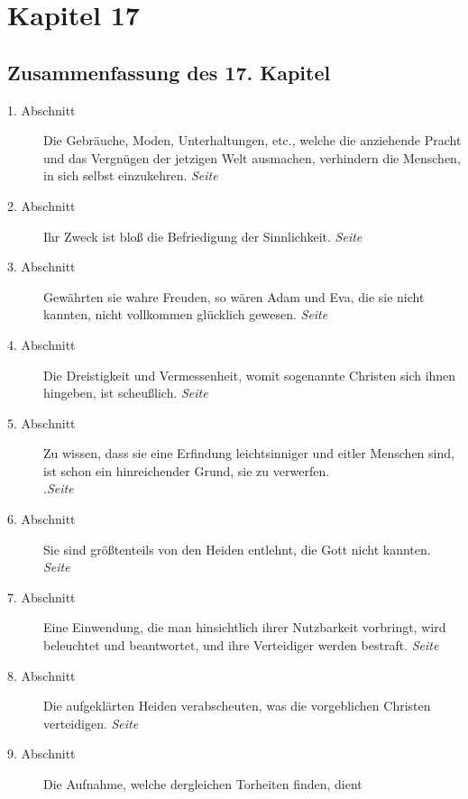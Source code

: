 
\chapter{Kapitel 17} \label{kap17}
\section{Zusammenfassung des 17. Kapitel}

\begin{description}
\item[1. Abschnitt] Die Gebräuche, Moden, Unterhaltungen, etc., welche die
anziehende Pracht und das Vergnügen der jetzigen Welt ausmachen, verhindern die
Menschen, in sich selbst einzukehren.
\dotfill \textit{Seite~\pageref{kap17_ab1}}\\
\item[2. Abschnitt] Ihr Zweck ist bloß die Befriedigung der Sinnlichkeit.
\dotfill \textit{Seite~\pageref{kap17_ab2}}\\
\item[3. Abschnitt] Gewährten sie wahre Freuden, so wären Adam und Eva, die sie
nicht kannten, nicht vollkommen glücklich gewesen.
\dotfill \textit{Seite~\pageref{kap17_ab3}}\\
\item[4. Abschnitt] Die Dreistigkeit und Vermessenheit, womit sogenannte
Christen sich ihnen hingeben, ist scheußlich.
\dotfill \textit{Seite~\pageref{kap17_ab4}}\\
\item[5. Abschnitt] Zu wissen, dass sie eine Erfindung leichtsinniger und eitler
Menschen sind, ist schon ein hinreichender Grund, sie zu verwerfen.
\\.\dotfill \textit{Seite~\pageref{kap17_ab5}}\\
\item[6. Abschnitt] Sie sind größtenteils von den Heiden entlehnt, die Gott
nicht kannten.
\dotfill \textit{Seite~\pageref{kap17_ab6}}\\
\item[7. Abschnitt] Eine Einwendung, die man hinsichtlich ihrer Nutzbarkeit
vorbringt, wird beleuchtet und beantwortet, und ihre Verteidiger werden
bestraft.
\dotfill \textit{Seite~\pageref{kap17_ab7}}\\
\item[8. Abschnitt] Die aufgeklärten Heiden verabscheuten, was die vorgeblichen
Christen verteidigen.
\dotfill \textit{Seite~\pageref{kap17_ab8}}\\
\item[9. Abschnitt] Die Aufnahme, welche dergleichen Torheiten finden, dient

\end{description}
